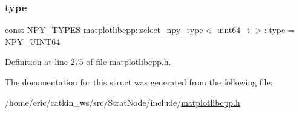 \subsubsection{\texorpdfstring{type}{type}}
{\footnotesize\ttfamily const N\+P\+Y\+\_\+\+T\+Y\+P\+ES \mbox{\hyperlink{structmatplotlibcpp_1_1select__npy__type}{matplotlibcpp\+::select\+\_\+npy\+\_\+type}}$<$ uint64\+\_\+t $>$\+::type = N\+P\+Y\+\_\+\+U\+I\+N\+T64\hspace{0.3cm}{\ttfamily [static]}}



Definition at line 275 of file matplotlibcpp.\+h.



The documentation for this struct was generated from the following file\+:\begin{DoxyCompactItemize}
\item 
/home/eric/catkin\+\_\+ws/src/\+Strat\+Node/include/\mbox{\hyperlink{matplotlibcpp_8h}{matplotlibcpp.\+h}}\end{DoxyCompactItemize}
